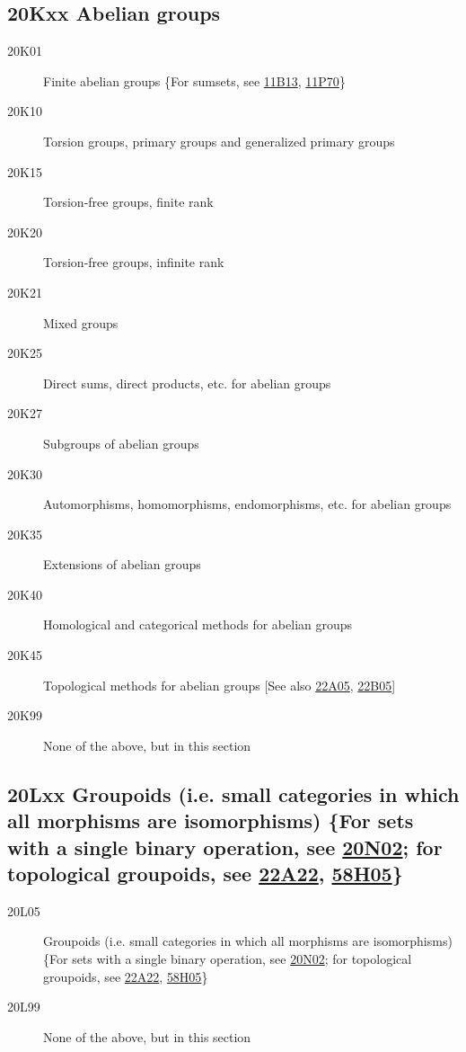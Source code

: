 \documentclass[letterpaper]{article}
\begin{document}
\subsection*{20Kxx  Abelian groups }\label{20Kxx}
\begin{description}
\item [20K01]\label{20K01} Finite abelian groups \{For sumsets, see \hyperref[11B13]{11B13}, \hyperref[11P70]{11P70}\}
\item [20K10]\label{20K10} Torsion groups, primary groups and generalized primary groups
\item [20K15]\label{20K15} Torsion-free groups, finite rank
\item [20K20]\label{20K20} Torsion-free groups, infinite rank
\item [20K21]\label{20K21} Mixed groups
\item [20K25]\label{20K25} Direct sums, direct products, etc. for abelian groups
\item [20K27]\label{20K27} Subgroups of abelian groups
\item [20K30]\label{20K30} Automorphisms, homomorphisms, endomorphisms, etc. for abelian groups
\item [20K35]\label{20K35} Extensions of abelian groups
\item [20K40]\label{20K40} Homological and categorical methods for abelian groups
\item [20K45]\label{20K45} Topological methods for abelian groups [See also \hyperref[22A05]{22A05}, \hyperref[22B05]{22B05}]
\item [20K99]\label{20K99} None of the above, but in this section
\end{description}
\subsection*{20Lxx  Groupoids (i.e. small categories in which all morphisms are isomorphisms) \{For sets with a single binary operation, see \hyperref[20N02]{20N02}; for topological groupoids, see \hyperref[22A22]{22A22}, \hyperref[58H05]{58H05}\} }\label{20Lxx}
\begin{description}  
\item [20L05]\label{20L05} Groupoids (i.e. small categories in which all morphisms are isomorphisms) \{For sets with a single binary operation, see \hyperref[20N02]{20N02}; for topological groupoids, see \hyperref[22A22]{22A22}, \hyperref[58H05]{58H05}\}
\item [20L99]\label{20L99} None of the above, but in this section
\end{description}
\end{document}
